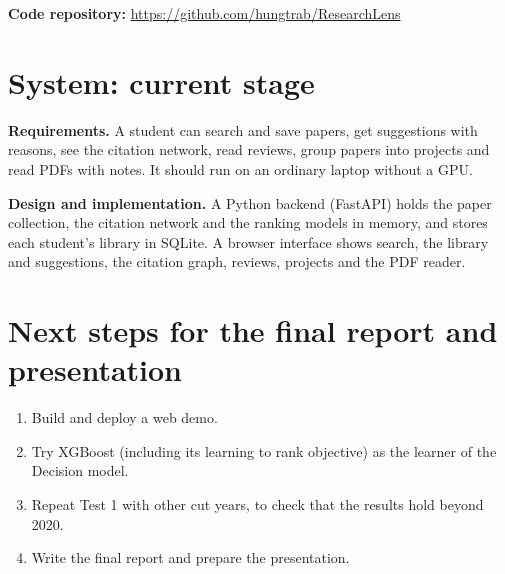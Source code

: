 \documentclass[11pt,a4paper]{article}
\newcommand{\RepoURL}{\url{https://github.com/hungtrab/ResearchLens}}
\begin{document}
\textbf{Code repository:} \RepoURL

\section{System: current stage}
\textbf{Requirements.} A student can search and save papers, get suggestions with reasons, see the citation network, read reviews, group papers into projects and read PDFs with notes. It should run on an ordinary laptop without a GPU.

\textbf{Design and implementation.} A Python backend (FastAPI) holds the paper collection, the citation network and the ranking models in memory, and stores each student's library in SQLite. A browser interface shows search, the library and suggestions, the citation graph, reviews, projects and the PDF reader.

\section{Next steps for the final report and presentation}
\begin{enumerate}
\item Build and deploy a web demo.
\item Try XGBoost (including its learning to rank objective) as the learner of the Decision model.
\item Repeat Test 1 with other cut years, to check that the results hold beyond 2020.
\item Write the final report and prepare the presentation.
\end{enumerate}
\end{document}

